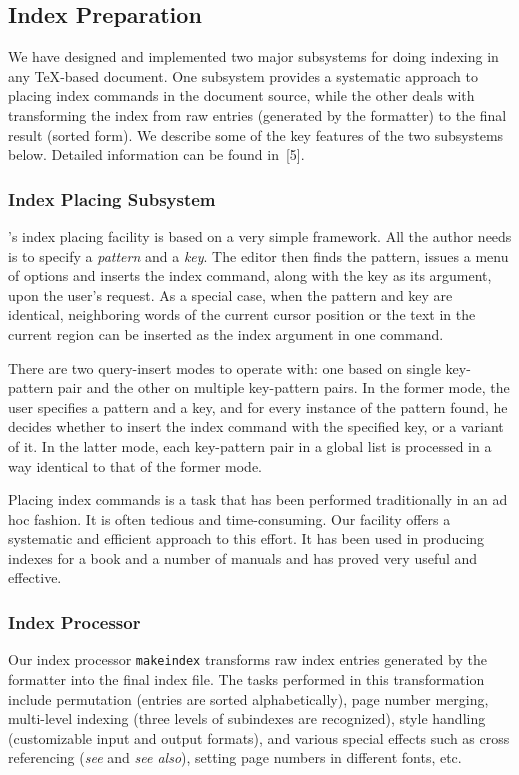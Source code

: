 \subsection{Index Preparation}
We have designed and implemented two major subsystems for doing indexing
in any {\TeX}-based document.  One subsystem provides a systematic approach
to placing index commands in the document source, while the other deals
with transforming the index from raw entries (generated by the formatter)
to the final result (sorted form).  We describe some of the key features
of the two subsystems below.  Detailed information can be found in~[5].

\subsubsection{Index Placing Subsystem}
{\TM}'s index placing facility is based on a very simple framework.
All the author needs is
to specify a {\it pattern\/} and a {\it key\/}.
The editor then finds the pattern,
issues a menu of options and inserts the index command, along with the key
as its argument, upon the user's request.
As a special case, when the pattern and key are identical,
neighboring words of the current cursor position
or the text in the current region can be inserted as the index argument
in one {\TM} command.

There are two query-insert modes to operate with: 
one based on single key-pattern pair and the other
on multiple key-pattern pairs.
In the former mode, the user specifies a pattern and a key, and for
every instance of the pattern found, he decides whether to insert the
index command with the specified key, or a variant of it.
In the latter mode, each key-pattern pair
in a global list is processed in a way identical to that of the former mode.

Placing index commands is a task that has been performed traditionally in
an ad hoc fashion.  It is often tedious and time-consuming.
Our facility offers a systematic and efficient approach to this effort.
It has been used in producing indexes for a book and a number of manuals
and has proved very useful and effective.

\subsubsection{Index Processor}
Our index processor \verb|makeindex|
transforms raw index entries generated by the formatter
into the final index file.  The tasks performed in this transformation
include permutation (entries are sorted alphabetically),
page number merging, multi-level indexing (three levels of subindexes
are recognized), style handling (customizable input and output formats),
and various special effects such as cross referencing ({\it see\/} and 
{\it see also\/}), setting page numbers in different fonts, etc.

